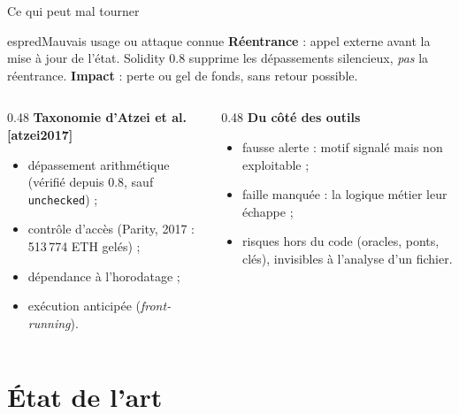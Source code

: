 \documentclass[11pt,aspectratio=169]{beamer}
\newcommand{\refcite}[1]{\textbf{[#1]}}
\begin{document}
\begin{frame}{Ce qui peut mal tourner}
  \begin{bloc}{espred}{Mauvais usage ou attaque connue}
    \footnotesize
    \textbf{Réentrance} : appel externe avant la mise à jour de l'état. Solidity 0.8 supprime les dépassements silencieux, \emph{pas} la réentrance. \textbf{Impact} : perte ou gel de fonds, sans retour possible.
    \vspace{3pt}

    \begin{columns}[T]
      \begin{column}{0.48\textwidth}
        \textbf{Taxonomie d'Atzei et al.} \refcite{atzei2017}
        \begin{itemize}
          \item dépassement arithmétique (vérifié depuis 0.8, sauf \texttt{unchecked}) ;
          \item contrôle d'accès (Parity, 2017 : 513\,774 ETH gelés) ;
          \item dépendance à l'horodatage ;
          \item exécution anticipée (\emph{front-running}).
        \end{itemize}
      \end{column}
      \begin{column}{0.48\textwidth}
        \textbf{Du côté des outils}
        \begin{itemize}
          \item fausse alerte : motif signalé mais non exploitable ;
          \item faille manquée : la logique métier leur échappe ;
          \item risques hors du code (oracles, ponts, clés), invisibles à l'analyse d'un fichier.
        \end{itemize}
      \end{column}
    \end{columns}
  \end{bloc}
\end{frame}

\section{État de l'art}
\end{document}
